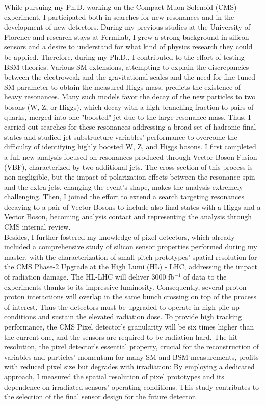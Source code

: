 {\begin{flushleft}
\vspace{\baselineskip}
While pursuing my Ph.D. working on the Compact Muon Solenoid (CMS) experiment, I participated both in searches for new resonances and in the development of new detectors. During my previous studies at the University of Florence and research stays at Fermilab, I grew a strong background in silicon sensors and a desire to understand for what kind of physics research they could be applied. Therefore, during my Ph.D., I contributed to the effort of testing BSM theories. Various SM extensions, attempting to explain the discrepancies between the electroweak and the gravitational scales and the need for fine-tuned SM parameter to obtain the measured Higgs mass, predicts the existence of heavy resonances. Many such models favor the decay of the new particles to two bosons (W, Z, or Higgs), which decay with a high branching fraction to pairs of quarks, merged into one "boosted" jet due to the large resonance mass. Thus, I carried out searches for these resonances addressing a broad set of hadronic final states and studied jet substructure variables' performance to overcome the difficulty of identifying highly boosted W, Z, and Higgs bosons. I first completed a full new analysis focused on resonances produced through Vector Boson Fusion (VBF), characterized by two additional jets. The cross-section of this process is non-negligible, but the impact of polarization effects between the resonance spin and the extra jets, changing the event's shape, makes the analysis extremely challenging. Then, I joined the effort to extend a search targeting resonances decaying to a pair of Vector Bosons to include also final states with a Higgs and a Vector Boson, becoming analysis contact and representing the analysis through CMS internal review. \\
Besides, I further fostered my knowledge of pixel detectors, which already included a comprehensive study of silicon sensor properties performed during my master, with the characterization of small pitch prototypes' spatial resolution for the CMS Phase-2 Upgrade at the High Lumi (HL) - LHC, addressing the impact of radiation damage. The HL-LHC will deliver 3000 fb$^{-1}$ of data to the experiments thanks to its impressive luminosity. Consequently, several proton-proton interactions will overlap in the same bunch crossing on top of the process of interest. Thus the detectors must be upgraded to operate in high pile-up conditions and sustain the elevated radiation dose. To provide high tracking performance, the CMS Pixel detector's granularity will be six times higher than the current one, and the sensors are required to be radiation hard. 
The hit resolution, the pixel detector's essential property, crucial for the reconstruction of variables and particles' momentum for many SM and BSM measurements, profits with reduced pixel size but degrades with irradiation: By employing a dedicated approach, I measured the spatial resolution of pixel prototypes and its dependence on irradiated sensors' operating conditions. This study contributes to the selection of the final sensor design for the future detector. 
\vspace{\baselineskip}


\end{flushleft}}

